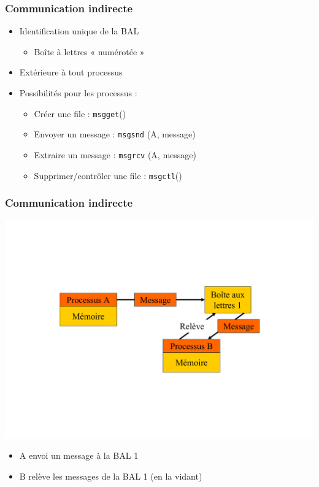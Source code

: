 \begin{frame}
\frametitle{Communication indirecte}
\begin{itemize}
\item Identification unique de la BAL
\begin{itemize}
\item Boîte à lettres « numérotée »
\end{itemize}
\item Extérieure à tout processus
\item Possibilités pour les processus :
\begin{itemize}
\item Créer une file : \texttt{msgget}()
\item Envoyer un message : \texttt{msgsnd} (A, message)
\item Extraire un message : \texttt{msgrcv} (A, message)
\item Supprimer/contrôler une file : \texttt{msgctl}()
\end{itemize}
\end{itemize}
\end{frame}

\begin{frame}
\frametitle{Communication indirecte}
\includegraphics[width=.9\textwidth]{../illustration/comm_indirecte.pdf}
\begin{itemize}
\item A envoi un message à la BAL 1
\item B relève les messages de la BAL 1 (en la vidant)
\end{itemize}
\end{frame}

